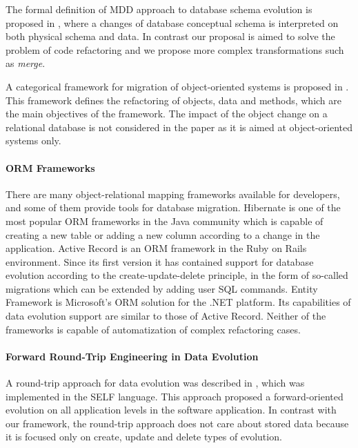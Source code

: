 \documentclass[runningheads]{comsis}
\begin{document}
The formal definition of MDD approach to database schema evolution is proposed in \cite{Aboulsamh:FormalModelingEvolution}, where a changes of database conceptual schema is interpreted on both physical schema and data. In contrast our proposal is aimed to solve the problem of code refactoring and we propose more complex transformations such as \emph{merge}.

A categorical framework for migration of object-oriented systems is proposed in \cite{Schulz:CategoricalModel}. This framework defines the refactoring of objects, data and methods, which are the main objectives of the framework. The impact of the object change on a relational database is not considered in the paper as it is aimed at object-oriented systems only.

\paragraph{ORM Frameworks} There are many object-relational mapping frameworks available for developers, and some of them provide tools for database migration. Hibernate \cite{Hibernate} is one of the most popular ORM frameworks in the Java community which is capable of creating a new table or adding a new column according to a change in the application. Active Record \cite{Active_Record} is an ORM framework in the Ruby on Rails environment. Since its first version it has contained support for database evolution according to the create-update-delete principle, in the form of so-called migrations \cite{Rails:Migrations} which can be extended by adding user SQL commands. Entity Framework \cite{Entity_Framework} is Microsoft's ORM solution for the .NET platform. Its capabilities of data evolution support are similar to those of Active Record. Neither of the frameworks is capable of automatization of complex refactoring cases.

\paragraph{Forward Round-Trip Engineering in Data Evolution} A round-trip approach for data evolution was described in \cite{VanPaesschen:2005to}, which was implemented in the SELF language. This approach proposed a forward-oriented evolution on all application levels in the software application. In contrast with our framework, the round-trip approach does not care about stored data because it is focused only on create, update and delete types of evolution.
\end{document}
